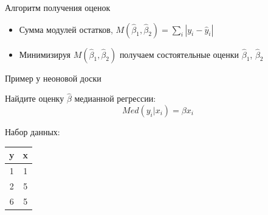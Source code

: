 \documentclass[ignorenonframetext,]{beamer}
\newcommand{\hy}{\hat{y}}
\newcommand{\hb}{\hat{\beta}}
\begin{document}
\begin{frame}{Алгоритм получения оценок}

\begin{itemize}
\item
  Сумма модулей остатков, \(M(\hb_1,\hb_2)=\sum_i |y_i - \hy_i|\)
\item
  Минимизируя \(M(\hb_1,\hb_2)\) получаем состоятельные оценки
  \(\hb_1\), \(\hb_2\)
\end{itemize}

\end{frame}

\begin{frame}{Пример у неоновой доски}

Найдите оценку \(\hb\) медианной регрессии: \[
Med(y_i|x_i)=\beta x_i
\]

Набор данных:

\begin{longtable}[c]{@{}cc@{}}
\toprule
\begin{minipage}[b]{0.05\columnwidth}\centering\strut
y
\strut\end{minipage} &
\begin{minipage}[b]{0.05\columnwidth}\centering\strut
x
\strut\end{minipage}\tabularnewline
\midrule
\endhead
\begin{minipage}[t]{0.05\columnwidth}\centering\strut
1
\strut\end{minipage} &
\begin{minipage}[t]{0.05\columnwidth}\centering\strut
1
\strut\end{minipage}\tabularnewline
\begin{minipage}[t]{0.05\columnwidth}\centering\strut
2
\strut\end{minipage} &
\begin{minipage}[t]{0.05\columnwidth}\centering\strut
5
\strut\end{minipage}\tabularnewline
\begin{minipage}[t]{0.05\columnwidth}\centering\strut
6
\strut\end{minipage} &
\begin{minipage}[t]{0.05\columnwidth}\centering\strut
5
\strut\end{minipage}\tabularnewline
\bottomrule
\end{longtable}

\end{frame}
\end{document}
